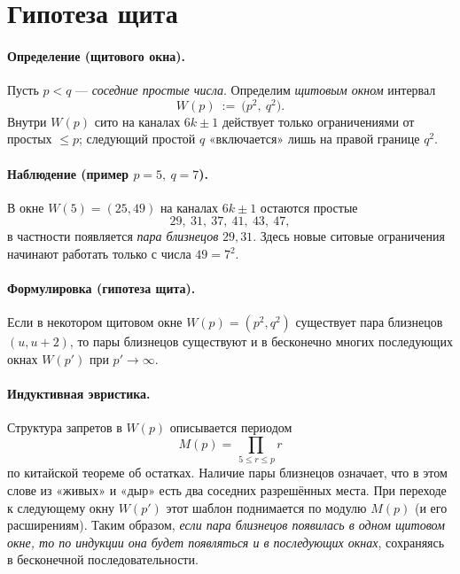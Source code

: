 \documentclass[11pt,a4paper]{article}
\begin{document}
\section{Гипотеза щита}

\paragraph{Определение (щитового окна).}
Пусть \(p<q\) --- \emph{соседние простые числа}. Определим \emph{щитовым окном} интервал
\[
W(p)\ :=\ \bigl(p^2,\ q^2\bigr).
\]
Внутри \(W(p)\) сито на каналах \(6k\pm1\) действует только ограничениями от простых \(\le p\);
следующий простой \(q\) «включается» лишь на правой границе \(q^2\).

\paragraph{Наблюдение (пример \(p=5,\ q=7\)).}
В окне \(W(5)=(25,49)\) на каналах \(6k\pm1\) остаются простые
\[
29,\ 31,\ 37,\ 41,\ 43,\ 47,
\]
в частности появляется \emph{пара близнецов} \(29,31\).
Здесь новые ситовые ограничения начинают работать только с числа \(49=7^2\).

\paragraph{Формулировка (гипотеза щита).}
Если в некотором щитовом окне \(W(p)=(p^2,q^2)\) существует пара близнецов \((u,u+2)\),
то пары близнецов существуют и в бесконечно многих последующих окнах \(W(p')\) при \(p'\to\infty\).

\paragraph{Индуктивная эвристика.}
Структура запретов в \(W(p)\) описывается периодом
\[
M(p)=\prod_{\,5\le r\le p} r
\]
по китайской теореме об остатках.
Наличие пары близнецов означает, что в этом слове из «живых» и «дыр» есть два соседних разрешённых места.
При переходе к следующему окну \(W(p')\) этот шаблон поднимается по модулю \(M(p)\) (и его расширениям).
Таким образом, \emph{если пара близнецов появилась в одном щитовом окне, то по индукции она будет появляться и в последующих окнах}, сохраняясь в бесконечной последовательности.
\end{document}
